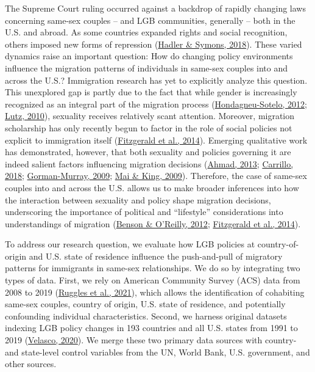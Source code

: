\documentclass[
  11pt,
]{article}
\begin{document}
The Supreme Court ruling occurred against a backdrop of rapidly changing laws concerning same-sex couples -- and LGB communities, generally -- both in the U.S. and abroad. As some countries expanded rights and social recognition, others imposed new forms of repression (\protect\hyperlink{ref-hadler_2018_world}{Hadler \& Symons, 2018}). These varied dynamics raise an important question: How do changing policy environments influence the migration patterns of individuals in same-sex couples into and across the U.S.? Immigration research has yet to explicitly analyze this question. This unexplored gap is partly due to the fact that while gender is increasingly recognized as an integral part of the migration process (\protect\hyperlink{ref-hondagneu-sotelo_2012}{Hondagneu-Sotelo, 2012}; \protect\hyperlink{ref-lutz_2010}{Lutz, 2010}), sexuality receives relatively scant attention. Moreover, migration scholarship has only recently begun to factor in the role of social policies not explicit to immigration itself (\protect\hyperlink{ref-fitzgerald_2014}{Fitzgerald et al., 2014}). Emerging qualitative work has demonstrated, however, that both sexuality and policies governing it are indeed salient factors influencing migration decisions (\protect\hyperlink{ref-ahmad_2013}{Ahmad, 2013}; \protect\hyperlink{ref-carrillo_2018}{Carrillo, 2018}; \protect\hyperlink{ref-gorman-murray_2009}{Gorman-Murray, 2009}; \protect\hyperlink{ref-mai_2009}{Mai \& King, 2009}). Therefore, the case of same-sex couples into and across the U.S. allows us to make broader inferences into how the interaction between sexuality and policy shape migration decisions, underscoring the importance of political and ``lifestyle'' considerations into understandings of migration (\protect\hyperlink{ref-benson_2012}{Benson \& O'Reilly, 2012}; \protect\hyperlink{ref-fitzgerald_2014}{Fitzgerald et al., 2014}).

To address our research question, we evaluate how LGB policies at country-of-origin and U.S. state of residence influence the push-and-pull of migratory patterns for immigrants in same-sex relationships. We do so by integrating two types of data. First, we rely on American Community Survey (ACS) data from 2008 to 2019 (\protect\hyperlink{ref-ruggles_2021}{Ruggles et al., 2021}), which allows the identification of cohabiting same-sex couples, country of origin, U.S. state of residence, and potentially confounding individual characteristics. Second, we harness original datasets indexing LGB policy changes in 193 countries and all U.S. states from 1991 to 2019 (\protect\hyperlink{ref-velasco_2020}{Velasco, 2020}). We merge these two primary data sources with country- and state-level control variables from the UN, World Bank, U.S. government, and other sources.
\end{document}
